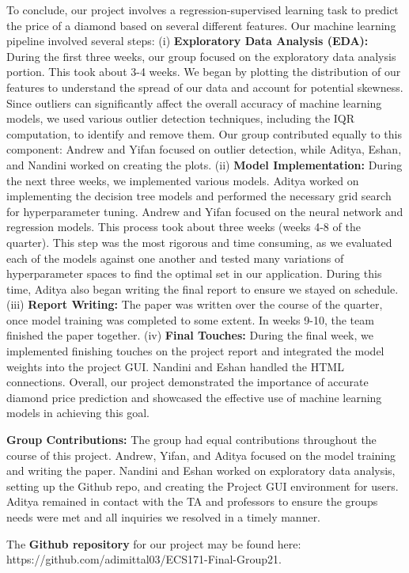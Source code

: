 \documentclass[conference]{IEEEtran}
\begin{document}
To conclude, our project involves a regression-supervised learning task to predict the price of a diamond based on several different features. Our machine learning pipeline involved several steps: (i) \textbf{Exploratory Data Analysis (EDA):} During the first three weeks, our group focused on the exploratory data analysis portion. This took about 3-4 weeks. We began by plotting the distribution of our features to understand the spread of our data and account for potential skewness. Since outliers can significantly affect the overall accuracy of machine learning models, we used various outlier detection techniques, including the IQR computation, to identify and remove them. Our group contributed equally to this component: Andrew and Yifan focused on outlier detection, while Aditya, Eshan, and Nandini worked on creating the plots. (ii) \textbf{Model Implementation:} During the next three weeks, we implemented various models. Aditya worked on implementing the decision tree models and performed the necessary grid search for hyperparameter tuning. Andrew and Yifan focused on the neural network and regression models. This process took about three weeks (weeks 4-8 of the quarter). This step was the most rigorous and time consuming, as we evaluated each of the models against one another and tested many variations of hyperparameter spaces to find the optimal set in our application. During this time, Aditya also began writing the final report to ensure we stayed on schedule. (iii) \textbf{Report Writing:} The paper was written over the course of the quarter, once model training was completed to some extent. In weeks 9-10, the team finished the paper together. (iv) \textbf{Final Touches:} During the final week, we implemented finishing touches on the project report and integrated the model weights into the project GUI. Nandini and Eshan handled the HTML connections. Overall, our project demonstrated the importance of accurate diamond price prediction and showcased the effective use of machine learning models in achieving this goal.

\textbf{Group Contributions:} The group had equal contributions throughout the course of this project. Andrew, Yifan, and Aditya focused on the model training and writing the paper. Nandini and Eshan worked on exploratory data analysis, setting up the Github repo, and creating the Project GUI environment for users. Aditya remained in contact with the TA and professors to ensure the groups needs were met and all inquiries we resolved in a timely manner. 

The \textbf{Github repository} for our project may be found here: https://github.com/adimittal03/ECS171-Final-Group21. 
\end{document}
